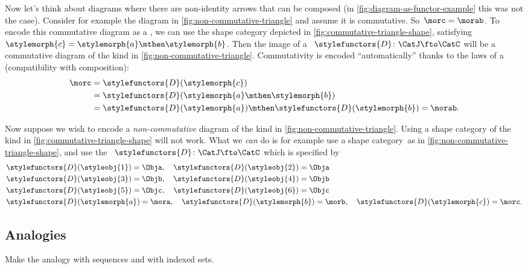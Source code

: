 Now let's think about diagrams where there are non-identity arrows that can be composed (in \cref{fig:diagram-as-functor-example} this was not the case).
Consider for example the diagram in \cref{fig:non-commutative-triangle} and assume it is commutative.
So~$\morc = \morab$.
To encode this commutative diagram as a , we can use the shape category depicted in \cref{fig:commutative-triangle-shape}, satisfying~$\stylemorph{c} = \stylemorph{a} \mthen \stylemorph{b}$.
Then the image of a ~$\stylefunctors{D}\colon \CatJ \fto \CatC$ will be a commutative diagram of the kind in \cref{fig:non-commutative-triangle}.
Commutativity is encoded ``automatically'' thanks to the laws of a  (compatibility with composition):
\begin{align}
    \morc & = \stylefunctors{D}(\stylemorph{c}) \\
          & = \stylefunctors{D}(\stylemorph{a} \mthen \stylemorph{b}) \\
          & = \stylefunctors{D}(\stylemorph{a}) \mthen \stylefunctors{D}(\stylemorph{b}) = \morab.
\end{align}

\begin{marginfigure}
    \centering
    \caption{}
    \label{fig:non-commutative-triangle-shape}
\end{marginfigure}

Now suppose we wish to encode a \emph{non-commutative} diagram of the kind in \cref{fig:non-commutative-triangle}.
Using a shape category of the kind in \cref{fig:commutative-triangle-shape} will not work.
What we \emph{can} do is for example use a shape category~\CatJ as in \cref{fig:non-commutative-triangle-shape}, and use the ~$\stylefunctors{D}\colon \CatJ \fto \CatC$ which is specified by
\begin{align}
     & \stylefunctors{D}(\styleobj{1}) = \Obja, \quad \stylefunctors{D}(\styleobj{2}) = \Obja \\
     & \stylefunctors{D}(\styleobj{3}) = \Objb, \quad \stylefunctors{D}(\styleobj{4}) = \Objb \\
     & \stylefunctors{D}(\styleobj{5}) = \Objc, \quad \stylefunctors{D}(\styleobj{6}) = \Objc \\
     & \stylefunctors{D}(\stylemorph{a}) = \mora, \quad \stylefunctors{D}(\stylemorph{b}) = \morb, \quad \stylefunctors{D}(\stylemorph{c}) = \morc.
\end{align}

\subsection{Analogies}

Make the analogy with sequences and with indexed sets.

\XXX


